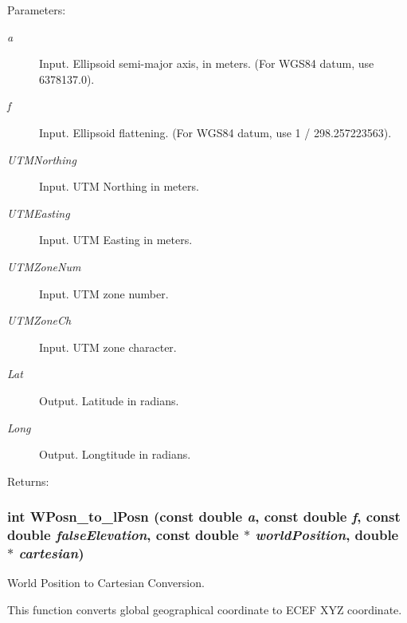 \begin{Desc}
\item[Parameters:]
\begin{description}
\item[{\em a}]Input. Ellipsoid semi-major axis, in meters. (For WGS84 datum, use 6378137.0). \item[{\em f}]Input. Ellipsoid flattening. (For WGS84 datum, use 1 / 298.257223563). \item[{\em UTMNorthing}]Input. UTM Northing in meters. \item[{\em UTMEasting}]Input. UTM Easting in meters. \item[{\em UTMZoneNum}]Input. UTM zone number. \item[{\em UTMZoneCh}]Input. UTM zone character. \item[{\em Lat}]Output. Latitude in radians. \item[{\em Long}]Output. Longtitude in radians.\end{description}
\end{Desc}
\begin{Desc}
\item[Returns:]\end{Desc}
\hypertarget{group__Coordinate_gc93c21c7f2c3b69bd38c0123bba28b36}{
\subsubsection[WPosn\_\-to\_\-lPosn]{\setlength{\rightskip}{0pt plus 5cm}int WPosn\_\-to\_\-lPosn (const double {\em a}, \/  const double {\em f}, \/  const double {\em falseElevation}, \/  const double $\ast$ {\em worldPosition}, \/  double $\ast$ {\em cartesian})}}
\label{group__Coordinate_gc93c21c7f2c3b69bd38c0123bba28b36}


World Position to Cartesian Conversion. 

This function converts global geographical coordinate to ECEF XYZ coordinate.

